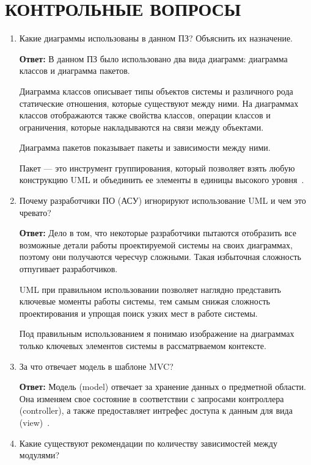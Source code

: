 \section*{КОНТРОЛЬНЫЕ ВОПРОСЫ}

\begin{enumerate}[label=\arabic*)]

\item 
  Какие диаграммы использованы в данном ПЗ? Объяснить их назначение.
  
  \textbf{Ответ:} 
  В данном ПЗ было использовано два вида диаграмм: диаграмма классов
  и диаграмма пакетов.
  
  Диаграмма классов описывает типы объектов системы и различного
  рода статические отношения, которые существуют между ними. На
  диаграммах классов отображаются также свойства классов, операции
  классов и ограничения, которые накладываются на связи между объектами.

  Диаграмма пакетов показывает пакеты и зависимости между ними.

  Пакет --– это инструмент группирования, который позволяет
  взять любую конструкцию UML и объединить ее элементы в единицы
  высокого уровня~\cite{fowler04}.

\item
  Почему разработчики ПО (АСУ) игнорируют использование UML и чем это чревато?

  \textbf{Ответ:} 
  Дело в том, что некоторые разработчики пытаются отобразить все возможные детали 
  работы проектируемой системы на своих диаграммах, поэтому они 
  получаются чересчур сложными. Такая избыточная сложность отпугивает разработчиков.

  UML при правильном использовании позволяет наглядно представить ключевые моменты
  работы системы, тем самым снижая сложность проектирования и упрощая поиск
  узких мест в работе системы.

  Под правильным использованием я понимаю изображение на диаграммах только 
  ключевых элементов системы в рассматрваемом контексте.

\item
  За что отвечает модель в шаблоне MVC?

  \textbf{Ответ:} 
  Модель (model) отвечает за хранение данных о предметной области.
  Она изменяем свое состояние в соответствии с запросами контроллера (controller),
  а также предоставляет интрефес доступа к данным для вида
  (view)~\cite{wiki_mvc}.

\item
  Какие существуют рекомендации по количеству зависимостей между модулями?
  

\end{enumerate}
